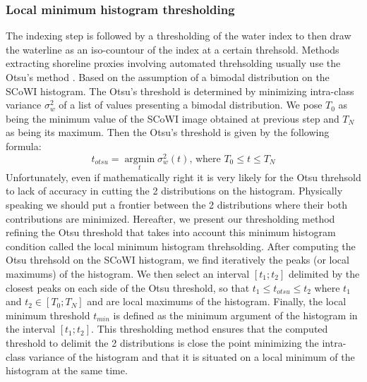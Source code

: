 \documentclass[remotesensing,article,submit,pdftex,moreauthors]{Definitions/mdpi}
\begin{document}
\subsubsection{Local minimum histogram thresholding}
The indexing step is followed by a thresholding of the water index to then draw the waterline as an iso-countour of the index at a certain threhsold.
Methods extracting shoreline proxies involving automated threhsolding usually use the Otsu's method \citep{Bishop_sub_pixel, VOS2019_sub}.
Based on the assumption of a bimodal distribution on the SCoWI histogram.
The Otsu's threshold is determined by minimizing intra-class variance $\sigma_w^2$ of a list of values presenting a bimodal distribution. \citep{OTSU1979}
We pose $T_0$ as being the minimum value of the SCoWI image obtained at previous step and $T_N$ as being its maximum.
Then the Otsu's threshold is given by the following formula:
\begin{equation}
    t_{otsu} = \operatorname*{argmin}_t \sigma_w^2(t) \text{, where }T_0 \le t \le T_N
\end{equation}
Unfortunately, even if mathematically right it is very likely for the Otsu threhsold to lack of accuracy in cutting the 2 distributions on the histogram.
Physically speaking we should put a frontier between the 2 distributions where their both contributions are minimized.
Hereafter, we present our thresholding method refining the Otsu threshold that takes into account this minimum histogram condition called the local minimum histogram threhsolding.
After computing the Otsu threhsold on the SCoWI histogram, we find iteratively the peaks (or local maximums) of the histogram.
We then select an interval $[t_1 ; t_2]$ delimited by the closest peaks on each side of the Otsu threshold, so that $t_1 \le t_{otsu} \le t_2$ where $t_1$ and $t_2 \in [T_0;T_N]$ and are local maximums of the histogram.
Finally, the local minimum threshold $t_{min}$ is defined as the minimum argument of the histogram in the interval $[t_1 ; t_2]$.
This thresholding method ensures that the computed threshold to delimit the 2 distributions is close the point minimizing the intra-class variance of the histogram and that it is situated on a local minimum of the histogram at the same time. 
    
\end{document}
